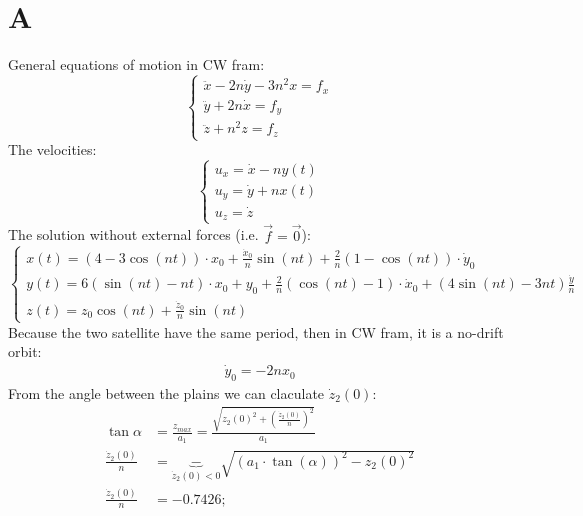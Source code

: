 \documentclass[11pt, a4paper]{article}
\begin{document}
\section{A}
General equations of motion in CW fram:
\begin{equation}
    \left\{\begin{array}{l}
        \ddot{x}-2n\dot{y}-3n^2x=f_x\\
        \ddot{y}+2n\dot{x}=f_y\\
        \ddot{z}+n^2z=f_z
    \end{array}\right.
\end{equation}
The velocities:
\begin{equation}
    \left\{\begin{array}{l}
        u_x = \dot{x}-ny(t)\\
        u_y = \dot{y}+nx(t)\\
        u_z = \dot{z}
    \end{array}\right.
\end{equation}
The solution without external forces (i.e. $\vec{f}=\vec{0}$):
\begin{equation}
    \left\{\begin{array}{l}
        \displaystyle x(t) = \left(4-3\cos(nt)\right)\cdot x_0 + \frac{\dot{x}_0}{n}\sin(nt)+\frac{2}{n}\left(1-\cos(nt)\right)\cdot\dot{y}_0 \\
        \displaystyle y(t) = 6\left(\sin(nt)-nt\right)\cdot x_0 + y_0 + \frac{2}{n}\left(\cos(nt)-1\right)\cdot\dot{x}_0 + \left(4\sin(nt)-3nt\right)\frac{\dot{y}}{n} \\
        \displaystyle z(t)=z_0\cos(nt)+\frac{\dot{z}_0}{n}\sin(nt)
    \end{array}\right.
\end{equation}
Because the two satellite have the same period, then in CW fram, it is a no-drift orbit:
\begin{equation}
    \begin{array}{l}
        \dot{y}_0=-2nx_0
    \end{array}
\end{equation}
From the angle between the plains we can claculate $\dot{z}_2(0)$:
\begin{align}
    \tan\alpha &= \frac{z_{max}}{a_1} = \frac{\displaystyle\sqrt{z_2(0)^2+\left(\frac{\dot{z}_2(0)}{n}\right)^2}}{a_1} \\
    \frac{\dot{z}_2(0)}{n} &= \underbrace{-}_{\displaystyle\dot{z}_2(0)<0}\sqrt{\left(a_1\cdot\tan(\alpha)\right)^2-z_2(0)^2} \\
    \frac{\dot{z}_2(0)}{n} &= -0.7426;
\end{align}
\end{document}
